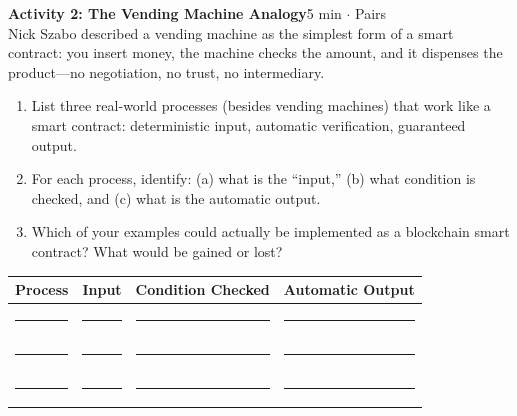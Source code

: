 \documentclass[11pt,a4paper]{article}
\newcommand{\activitybox}[3]{%
  \noindent\colorbox{mllavender4}{\parbox{\dimexpr\linewidth-2\fboxsep}{%
    \textbf{\color{mlpurple}#1}\hfill\textcolor{mlgray}{\small #2}\\[2pt]#3%
  }}\par\vspace{4pt}%
}
\newcommand{\fillcell}{\rule{2.2cm}{0.3pt}}
\begin{document}
\activitybox{Activity 2: The Vending Machine Analogy}{5 min $\cdot$ Pairs}{%
Nick Szabo described a vending machine as the simplest form of a smart contract: you insert money, the machine checks the amount, and it dispenses the product---no negotiation, no trust, no intermediary.
\begin{enumerate}
\item List three real-world processes (besides vending machines) that work like a smart contract: deterministic input, automatic verification, guaranteed output.
\item For each process, identify: (a) what is the ``input,'' (b) what condition is checked, and (c) what is the automatic output.
\item Which of your examples could actually be implemented as a blockchain smart contract? What would be gained or lost?
\end{enumerate}
\vspace{4pt}
{\footnotesize\renewcommand{\arraystretch}{1.35}%
\setlength{\tabcolsep}{5pt}%
\begin{tabular}{@{}p{3.0cm}p{3.0cm}p{3.0cm}p{3.5cm}@{}}
\toprule
\textbf{Process} & \textbf{Input} & \textbf{Condition Checked} & \textbf{Automatic Output} \\
\midrule
\fillcell & \fillcell & \fillcell & \fillcell \\
\fillcell & \fillcell & \fillcell & \fillcell \\
\fillcell & \fillcell & \fillcell & \fillcell \\
\bottomrule
\end{tabular}}
\vspace{2pt}
}

\vspace{2pt}
\end{document}

